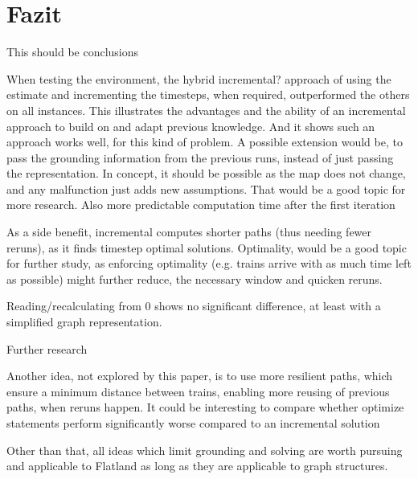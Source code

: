 \section{Fazit}
\color{red}  This should be conclusions \color{black}


When testing the environment, the hybrid \color{red}  incremental? \color{black} approach of using the estimate and incrementing the timesteps, when required, outperformed the others on all instances. This illustrates the advantages and the ability of an incremental approach to build on and adapt previous knowledge. And it shows such an approach works well, for this kind of problem. A possible extension would be, to pass the grounding information from the previous runs, instead of just passing the representation. In concept, it should be possible as the map does not change, and any malfunction just adds new assumptions. That would be a good topic for more research.\color{red}  Also more predictable computation time after the first iteration \color{black}

As a side benefit, incremental computes shorter paths (thus needing fewer reruns), as it finds timestep optimal solutions. Optimality, would be a good topic for further study, as enforcing optimality (e.g. trains arrive with as much time left as possible) might further reduce, the necessary window and quicken reruns.

\color{red}  Reading/recalculating from 0 shows no significant difference, at least with a simplified graph representation. \color{black}

\color{red}  Further research \color{black}

Another idea, not explored by this paper, is to use more resilient paths, which ensure a minimum distance between trains, enabling more reusing of previous paths, when reruns happen.  \color{red}  It could be interesting to compare whether optimize statements perform significantly worse compared to an incremental solution\color{black}

Other than that, all ideas which limit grounding and solving are worth pursuing and applicable to Flatland as long as they are applicable to graph structures.

